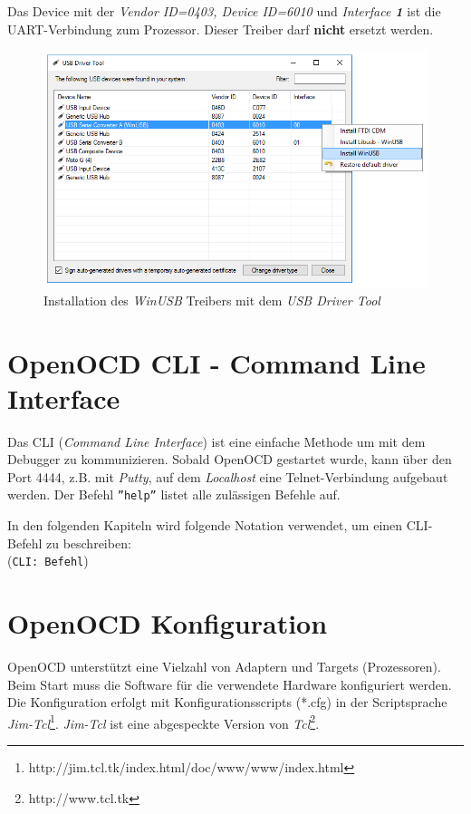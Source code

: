 Das Device mit der \textit{Vendor ID=0403, Device ID=6010} und \textit{Interface \textbf{1}} ist die UART-Verbindung zum Prozessor.
Dieser Treiber darf \textbf{nicht} ersetzt werden.

\begin{figure}[htbp]
	\centering
		\includegraphics[width=12cm,keepaspectratio]{images/InstallWinUSBDriver.png}
	\caption{Installation des \textit{WinUSB} Treibers mit dem \textit{USB Driver Tool}}
	\label{fig:InstallWinUSBDriver}
\end{figure}


\section{OpenOCD CLI - Command Line Interface}
Das CLI (\textit{Command Line Interface}) ist eine einfache Methode um mit dem Debugger zu kommunizieren.
Sobald OpenOCD gestartet wurde, kann über den Port 4444, z.B. mit \textit{Putty}, auf dem \textit{Localhost} eine Telnet-Verbindung aufgebaut werden.
Der Befehl \texttt{''help''} listet alle zulässigen Befehle auf.

In den folgenden Kapiteln wird folgende Notation verwendet, um einen CLI-Befehl zu beschreiben:\\
(\texttt{CLI: Befehl})


\section{OpenOCD Konfiguration}
OpenOCD unterstützt eine Vielzahl von Adaptern und Targets (Prozessoren).
Beim Start muss die Software für die verwendete Hardware konfiguriert werden.
Die Konfiguration erfolgt mit Konfigurationsscripts (*.cfg) in der Scriptsprache \textit{Jim-Tcl}\footnote{http://jim.tcl.tk/index.html/doc/www/www/index.html}.
\textit{Jim-Tcl} ist eine abgespeckte Version von \textit{Tcl}\footnote{http://www.tcl.tk}.

